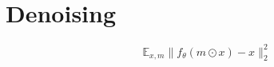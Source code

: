 \documentclass[11pt,a4paper]{article}
\begin{document}
\clearpage

\section{Denoising}

\[\mathbb{E}_{x,m}\lVert f_\theta(m\odot x)-x\rVert_2^2\]
\end{document}
